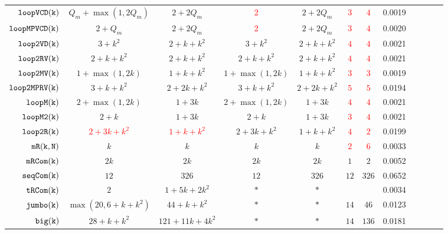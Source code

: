{\begin {table}[H]
\begin{center}
{\begin{tabular}{ | >{\tiny}r | c | c | c | c | c | c | c | c | c | c | c |}
         $  {\mathtt{loopVCD(k)}} $  &  ${Q_m+\max(1,2Q_m)}$  & $2+2Q_m$  & \textcolor{red}{$2$} & $2+2Q_m$ & \textcolor{red}{$3$} & \textcolor{red}{$4$} & 0.0019 \\
         $ {\mathtt{loopMPVCD(k)}}$  &  $2 + Q_m$  & $2+2Q_m$  & \textcolor{red}{$2$} & $2+2Q_m$ & \textcolor{red}{$3$} & \textcolor{red}{$4$} & 0.0020 \\
         $  \mathtt{loop2VD(k)}$  &   $3 + k^2$ & $2 + k + k^2$   &  $3 + k^2$ & $2 + k + k^2$  & \textcolor{red}{$4$} & \textcolor{red}{$4$} & 0.0021 \\
         $  \mathtt{loop2RV(k)}$  &  $ 2 + k +  k^2 $    &  $2 + k + k^2$   &  $ 2 + k +  k^2 $    &  $2 + k + k^2$ & \textcolor{red}{$4$} & \textcolor{red}{$4$} & 0.0021 \\
         $  \mathtt{loop2MV(k)}$  & $1 + \max(1,2k) $ &  $1 + k + k^2$ & $1 + \max(1,2k) $ &  $1 + k + k^2$ & \textcolor{red}{$3$} & \textcolor{red}{$3$} & 0.0019 \\
         $ \mathtt{loop2MPRV(k)}$  &  $3 + k + k^2  $ &  $2 + 2k + k^2$  &  $3 + k + k^2  $ &  $2 + 2k + k^2$ & \textcolor{red}{$5$} &\textcolor{red}{$5$}  & 0.0194  \\
         {$ \mathtt{loopM(k)}$}  &  $ 2 + \max(1,2k) $ & $1 + 3k  $  &   $ 2 + \max(1,2k) $ & $1 + 3k  $  & \textcolor{red}{$4$} & \textcolor{red}{$4$} & 0.0021 \\
         {$ \mathtt{loopM2(k)}$}  &  $2 + k $ & $1 + 3k$  &  $2 + k $ & $1 + 3k$ & \textcolor{red}{$3$} & \textcolor{red}{$4$} & 0.0021 \\
         {$\mathtt{loop2R(k)}$}&  \textcolor{red}{$2 + 3k + k^2$} &  \textcolor{red}{$1 + k + k^2$}  &  $2 + 3k + k^2$ &  $1 + k + k^2$ & \textcolor{red}{$4$} & \textcolor{red}{$2$} & 0.0199 \\
         $  \mathtt{mR(k, N)}$ & $ k   $ & $k $   &  $ k   $ & $k $ & \textcolor{red}{$2$} & \textcolor{red}{$6$} & 0.0033 \\
         $  \mathtt{mRCom(k)}$  & $2k $ & $ 2k $   &  $  2k $ & $ 2k $ & $1$ & $2$ & 0.0052 \\
         $  \mathtt{seqCom(k)}$ & $12  $  & $326 $  &   $12  $  & $326 $ &$12  $  & $326 $ & 0.0652 \\
         $  \mathtt{tRCom(k)}$ &  $ 2$ & $ 1 + 5k + 2 k^2 $  &  $ * $   &   $* $ & & & 0.0034  \\
         $  \mathtt{{jumbo(k)}}$ & $  \max(20, 6+k+k^2)$   &   $ {44+k+k^2} $  &  $ * $   &  $* $ & $14$ & $46$ & 0.0123 \\
         $  {\mathtt{big(k)}} $ &   $28 + k + k^2$ &  $121+11k+4k^2 $  &  $ * $   &  $* $ & $14$ & $136$ & 0.0181 \\
        \hline \hline 
        \end{tabular}
}
\end{center}
\end{table}
}


